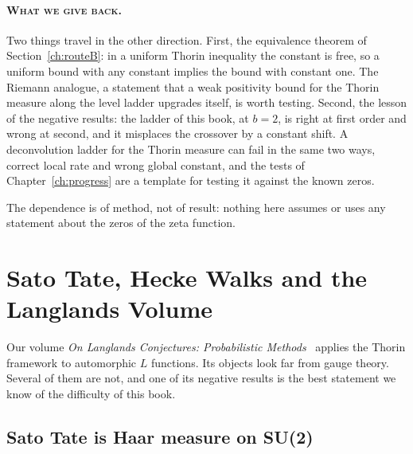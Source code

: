 \paragraph{\normalfont\scshape What we give back.} Two things travel in the other direction. First, the equivalence theorem of Section~\ref{ch:routeB}: in a uniform Thorin inequality the constant is free, so a uniform bound with any constant implies the bound with constant one. The Riemann analogue, a statement that a weak positivity bound for the Thorin measure along the level ladder upgrades itself, is worth testing. Second, the lesson of the negative results: the ladder of this book, at $b=2$, is right at first order and wrong at second, and it misplaces the crossover by a constant shift. A deconvolution ladder for the Thorin measure can fail in the same two ways, correct local rate and wrong global constant, and the tests of Chapter~\ref{ch:progress} are a template for testing it against the known zeros.

The dependence is of method, not of result: nothing here assumes or uses any statement about the zeros of the zeta function.

\section{Sato Tate, Hecke Walks and the Langlands Volume}\label{ch:langlands}

Our volume \emph{On Langlands Conjectures: Probabilistic Methods}~\cite{PS26l} applies the Thorin framework to automorphic $L$ functions. Its objects look far from gauge theory. Several of them are not, and one of its negative results is the best statement we know of the difficulty of this book.

\subsection{Sato Tate is Haar measure on SU(2)}

